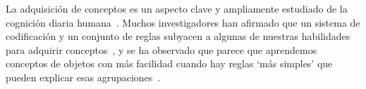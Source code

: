 La adquisición de conceptos es un aspecto clave y ampliamente estudiado de la cognición diaria humana~\cite{cohen2005handbook, ashby2011human}. Muchos investigadores han afirmado que un sistema de codificación y un conjunto de reglas subyacen a algunas de nuestras habilidades para adquirir conceptos~\cite{nosofsky1994rule, tenenbaum2011grow, maddox1993comparing}, y se ha observado que parece que aprendemos conceptos de objetos con más facilidad cuando hay reglas `más simples' que pueden explicar esas agrupaciones~\cite{shepard1961learning, nosofsky1994comparing, rehder2005eyetracking, lewandowsky2011working, feldman2000minimization, blair2003easy, minda2001prototypes}.

